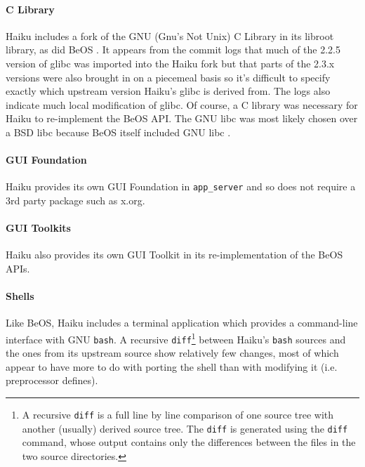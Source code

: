 \documentclass{article}
\begin{document}
\paragraph{C Library}
Haiku includes a fork of the GNU (Gnu's Not Unix) C Library in its
libroot library, as did BeOS \cite{GlibCWiki}.  It appears from the
commit logs that much of the 2.2.5 version of glibc was imported into
the Haiku fork
\cite{HaikuLibrootGlibcOld} but that parts of the 2.3.x versions were
also brought in on a piecemeal basis \cite{HaikuLibrootGlibcRecent} so
it's difficult to specify exactly which upstream version Haiku's glibc
is derived from.  The logs also indicate much local modification of
glibc.  Of course, a C library was necessary for Haiku to re-implement
the BeOS API.  The GNU libc was most likely chosen over a BSD libc
because BeOS itself included GNU libc \cite{GlibCWiki}.

\paragraph{GUI Foundation}
Haiku provides its own GUI Foundation in \texttt{app\_server} and so
does not require a 3rd party package such as x.org.

\paragraph{GUI Toolkits}
Haiku also provides its own GUI Toolkit in its re-implementation of the
BeOS APIs.

\paragraph{Shells}
Like BeOS, Haiku includes a terminal application which provides a
command-line interface with GNU \texttt{bash}.  A recursive
\texttt{diff}\footnote{A recursive \texttt{diff} is a full line
by line comparison of one source tree with another (usually) derived
source tree.  The \texttt{diff} is generated using the \texttt{diff}
command, whose output contains only the differences between the files
in the two source directories.}  between Haiku's \texttt{bash} sources
and the ones from its upstream source show relatively few changes,
most of which appear to have more to do with porting the shell than
with modifying it (i.e. preprocessor defines).
\end{document}
